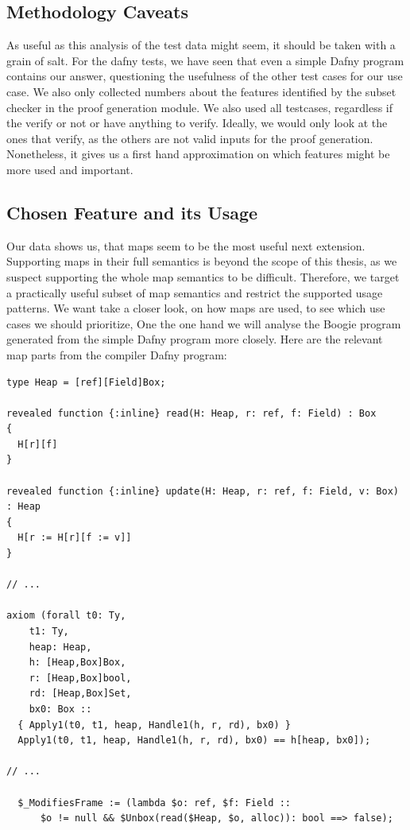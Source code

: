 \documentclass[11pt]{article}
\begin{document}
\subsection{Methodology Caveats}

As useful as this analysis of the test data might seem, it should be taken with a grain of salt.
For the dafny tests, we have seen that even a simple Dafny program contains our answer,
questioning the usefulness of the other test cases for our use case.
We also only collected numbers about the features identified by the subset checker in the proof generation module.
We also used all testcases, regardless if the verify or not or have anything to verify.
Ideally, we would only look at the ones that verify, as the others are not valid inputs for the proof generation.
Nonetheless, it gives us a first hand approximation on which features might be more used and important.


\subsection{Chosen Feature and its Usage}
\label{sec:goals-to-support}

Our data shows us, that maps seem to be the most useful next extension.
Supporting maps in their full semantics is beyond the scope of this thesis,
as we suspect supporting the whole map semantics to be difficult.
Therefore, we target a practically useful subset of map semantics
and restrict the supported usage patterns.
We want take a closer look, on how maps are used, to see which use cases we should prioritize,
One the one hand we will analyse the Boogie program generated from the simple Dafny program more closely.
Here are the relevant map parts from the compiler Dafny program:

\begin{verbatim}
type Heap = [ref][Field]Box;

revealed function {:inline} read(H: Heap, r: ref, f: Field) : Box
{
  H[r][f]
}

revealed function {:inline} update(H: Heap, r: ref, f: Field, v: Box) : Heap
{
  H[r := H[r][f := v]]
}

// ...

axiom (forall t0: Ty, 
    t1: Ty, 
    heap: Heap, 
    h: [Heap,Box]Box, 
    r: [Heap,Box]bool, 
    rd: [Heap,Box]Set, 
    bx0: Box :: 
  { Apply1(t0, t1, heap, Handle1(h, r, rd), bx0) } 
  Apply1(t0, t1, heap, Handle1(h, r, rd), bx0) == h[heap, bx0]);

// ...

  $_ModifiesFrame := (lambda $o: ref, $f: Field :: 
      $o != null && $Unbox(read($Heap, $o, alloc)): bool ==> false);
\end{verbatim}
\end{document}
